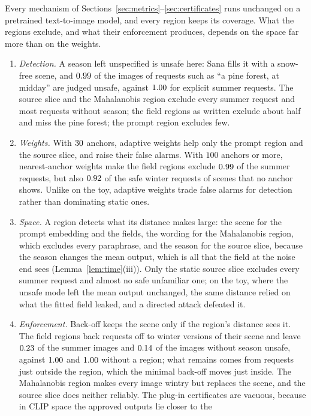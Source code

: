 \documentclass{article}
\theoremstyle{plain}
\theoremstyle{remark}
\begin{document}
Every mechanism of Sections~\ref{sec:metrics}--\ref{sec:certificates} runs unchanged on a pretrained text-to-image model, and every
region keeps its coverage. What the regions exclude, and what their enforcement produces, depends on the space far more than on the
weights.
\begin{enumerate}[label=(Q\arabic*)]
\item \emph{Detection.} A season left unspecified is unsafe here: Sana fills it with a snow-free scene, and $0.99$ of the
images of requests such as ``a pine forest, at midday'' are judged unsafe, against $1.00$ for explicit summer requests. The
source slice and the Mahalanobis region exclude every summer request and most requests without season; the field regions as written
exclude about half and miss the pine forest; the prompt region excludes few.
\item \emph{Weights.} With $30$ anchors, adaptive weights help only the prompt region and the source slice, and raise their false
alarms. With $100$ anchors or more, nearest-anchor weights make the field regions exclude $0.99$ of the summer requests, but
also $0.92$ of the safe winter requests of scenes that no anchor shows. Unlike on the toy, adaptive weights trade false
alarms for detection rather than dominating static ones.
\item \emph{Space.} A region detects what its distance makes large: the scene for the prompt embedding and the fields, the wording for
the Mahalanobis region, which excludes every paraphrase, and the season for the source slice, because the season changes the mean
output, which is all that the field at the noise end sees (Lemma~\ref{lem:time}(iii)). Only the static source slice excludes every
summer request and almost no safe unfamiliar one; on the toy, where the unsafe mode left the mean output unchanged, the same distance
relied on what the fitted field leaked, and a directed attack defeated it.
\item \emph{Enforcement.} Back-off keeps the scene only if the region's distance sees it. The field regions back requests off to
winter versions of their scene and leave $0.23$ of the summer images and $0.14$ of the images without season
unsafe, against $1.00$ and $1.00$ without a region; what remains comes from requests just outside the
region, which the minimal back-off moves just inside. The Mahalanobis region makes every image wintry but replaces the scene, and the
source slice does neither reliably. The plug-in certificates are vacuous, because in CLIP space the approved outputs lie closer to the

\end{enumerate}
\end{document}
